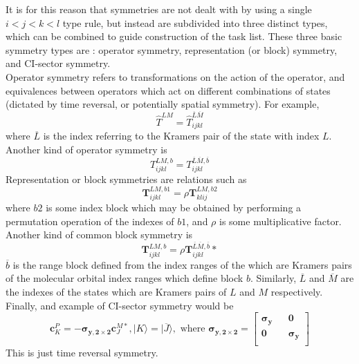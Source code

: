 \noindent It is for this reason that symmetries are not dealt with by using a
single $i<j<k<l$ type rule, but instead are subdivided into three distinct
types, which can be combined to guide construction of the task list. These
three basic symmetry types are : operator symmetry, representation (or block)
symmetry, and CI-sector symmetry.\\ 

\noindent Operator symmetry refers to transformations on the action of the
operator, and equivalences between operators which act on different
combinations of states (dictated by time reversal, or potentially spatial
symmetry). For example,
\begin{equation}
\hat{T}^{LM} = \hat{T}^{\overline{L}\overline{M}}_{ijkl} 
\end{equation}
\noindent where $\overline{L}$ is the index referring to the Kramers pair of the state with index $L$.
Another kind of operator symmetry is
\begin{equation}
T^{LM, b}_{ijkl} = T^{\overline{L}\overline{M}, \overline{b}}_{ijkl} 
\end{equation}
Representation or block symmetries are relations such as 
\begin{equation}
\mathbf{T}^{LM, b1}_{ijkl} = \rho \mathbf{T}^{LM, b2}_{klij} 
\end{equation}
where $b2$ is some index block which may be obtained by performing a
permutation operation of the indexes of $b1$, and $\rho$ is some multiplicative factor.
Another kind of common block symmetry is
\begin{equation}
\mathbf{T}^{LM, b}_{ijkl} = \rho \mathbf{T}^{\overline{L}\overline{M}, \overline{b}}_{ijkl}* 
\end{equation}
$\overline{b}$ is the range
block defined from the index ranges of the which are Kramers pairs of the
molecular orbital index ranges which define block $b$. Similarly, $\overline{L}$
and  $\overline{M}$ are the indexes of the states which are Kramers pairs of
$L$ and $M$ respectively.\\

\noindent Finally, and example of CI-sector symmetry would be
\begin{equation*} 
\mathbf{c}_{K}^{P} =  -\boldsymbol{\sigma_{y,2\times 2}}\mathbf{c}_{J}^{M*}, 
|K\rangle =  |\overline{J}\rangle, 
\text{ \ \ \ where  \ \ \ } 
\boldsymbol{\sigma_{y,2\times 2}} = 
\begin{bmatrix}
\boldsymbol{\sigma_{y}} && \mathbf{0} \\ 
\mathbf{0} && \boldsymbol{\sigma_{y}} \\
\end{bmatrix}
\end{equation*}
\noindent This is just time reversal symmetry.\\

